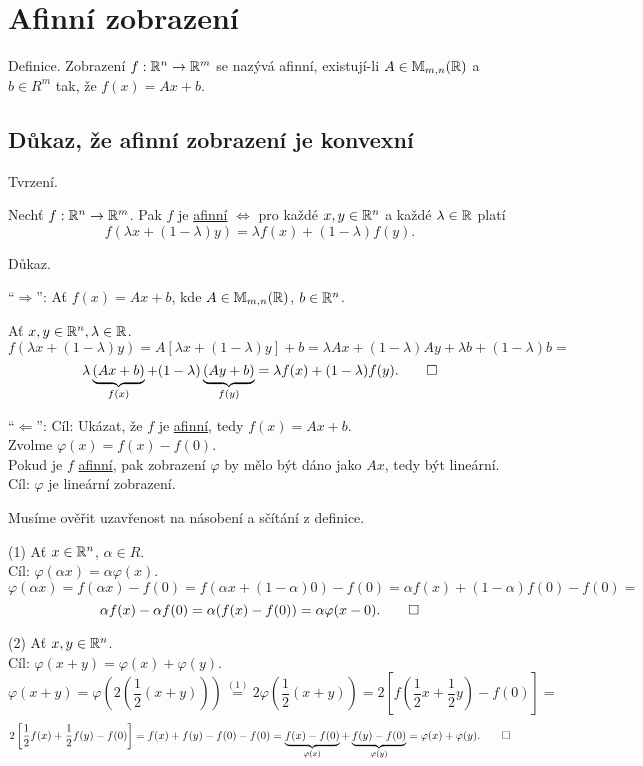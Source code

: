 \section*{Afinní zobrazení} \label{sec:afin}
Definice. Zobrazení $f: \mathbb{R}^n \rightarrow \mathbb{R}^m$ se nazývá afinní, existují-li $A \in \mathbb{M}_{m,n} (\mathbb{R})$ a $b \in R^m$
tak, že $f(x) = Ax + b$.

\subsection{Důkaz, že afinní zobrazení je konvexní}
Tvrzení.

Nechť $f: \mathbb{R}^n \rightarrow \mathbb{R}^m$. Pak $f$ je \hyperref[sec:afin]{afinní} $\iff$ pro každé $x,y \in \mathbb{R}^n$ a každé
$\lambda \in \mathbb{R}$ platí
\[f(\lambda x + (1-\lambda) y) =\lambda f(x) + (1-\lambda) f(y)\text{.}\]

Důkaz.

\enquote{$\Rightarrow$}: Ať $f(x) = Ax + b$, kde $A \in \mathbb{M}_{m,n} (\mathbb{R})$, $b \in \mathbb{R}^n$.

Ať $x, y \in \mathbb{R}^n, \lambda \in \mathbb{R}$.
\[
    f(\lambda x + (1 - \lambda) y) = A [\lambda x + (1-\lambda) y] + b = \lambda A x + (1-\lambda)Ay + \lambda b +
    (1-\lambda)b =
\]
\[
    \lambda \underbrace{(Ax + b)}_{f(x)} + (1-\lambda)\underbrace{(Ay + b)}_{f(y)} = \lambda f(x) + (1-\lambda)f(y). \qed
\]

\enquote{$\Leftarrow$}:
Cíl: Ukázat, že $f$ je \hyperref[sec:afin]{afinní}, tedy $f(x) = Ax + b$.\\
Zvolme $\varphi(x) = f(x) - f(0)$.\\
Pokud je $f$ \hyperref[sec:afin]{afinní}, pak zobrazení $\varphi$ by mělo být dáno jako $Ax$, tedy být lineární.\\
Cíl: $\varphi$ je lineární zobrazení.

Musíme ověřit uzavřenost na násobení a sčítání z definice.

(1) Ať $x \in \mathbb{R}^n$, $\alpha \in R$.\\
Cíl: $\varphi(\alpha x) = \alpha \varphi(x)$.
\[
    \varphi(\alpha x) = f(\alpha x) - f(0) = f(\alpha x + (1-\alpha)0) - f(0) = \alpha f(x) + (1-\alpha)f(0) - f(0) =
\]
\[
    \alpha f(x) - \alpha f(0) = \alpha (f(x) - f(0)) = \alpha \varphi (x-0). \qed
\]

(2) Ať $x, y \in \mathbb{R}^n$.\\
Cíl: $\varphi(x+y) = \varphi(x) + \varphi(y)$.
\[
    \varphi(x+y) = 
    \varphi \left(2 \left(\frac{1}{2} (x+y)\right)\right) \stackrel{(1)}{=} 2 \varphi \left(\frac{1}{2} (x+y)\right) =
    2 \left[f(\frac{1}{2}x + \frac{1}{2}y) - f(0)\right] = 
\]
\[
    2 \left[\frac{1}{2} f(x) + \frac{1}{2}f(y) - f(0) \right] = f(x) + f(y) - f(0) - f(0) = 
    \underbrace{f(x) - f(0)}_{\varphi(x)} + \underbrace{f(y) - f(0)}_{\varphi(y)} =
    \varphi(x) + \varphi(y). \qed
\]

